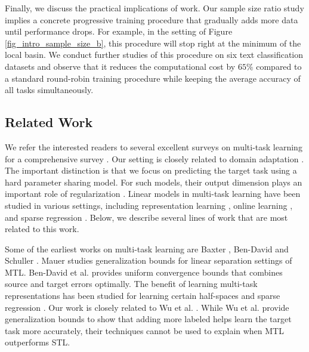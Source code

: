 Finally, we discuss the practical implications of work.
Our sample size ratio study implies a concrete progressive training procedure that gradually adds more data until performance drops.
For example, in the setting of Figure \ref{fig_intro_sample_size_b}, this procedure will stop right at the minimum of the local basin.
We conduct further studies of this procedure on six text classification datasets and observe that it reduces the computational cost by $65\%$ compared to a standard round-robin training procedure while keeping the average accuracy of all tasks simultaneously.



\subsection{Related Work}

We refer the interested readers to several excellent surveys on multi-task  learning for a comprehensive survey \cite{PY09,R17,ZY17,V20}.
Our setting is closely related to domain adaptation \cite{DM06,BB07,BC08,DH09,MMR09,CWB11,ZS13,NB17,ZD19}.
The important distinction is that we focus on predicting the target task using a hard parameter sharing model.
For such models, their output dimension plays an important role of regularization \cite{KD12}.
Linear models in multi-task learning have been studied in various settings, including representation learning \cite{BHKL19}, online learning \cite{CCG10,DCSP18}, and sparse regression \cite{LPVT11}.
Below, we describe several lines of work that are most related to this work.

Some of the earliest works on multi-task learning are Baxter \cite{B00}, Ben-David and Schuller \cite{BS03}.
Mauer \cite{M06} studies generalization bounds for linear separation settings of MTL.
Ben-David et al. \cite{BBCK10} provides uniform convergence bounds that combines source and target errors optimally.
The benefit of learning multi-task representations has been studied for learning certain half-spaces \cite{MPR16} and sparse regression \cite{LPTV09,LPVT11}.
Our work is closely related to Wu et al. \cite{WZR20}.
While Wu et al. provide generalization bounds to show that adding more labeled helps learn the target task more accurately, their techniques cannot be used to explain when MTL outperforms STL.

